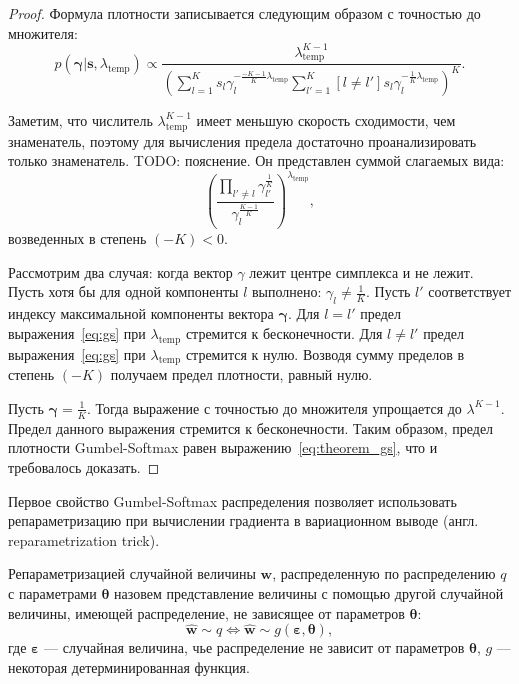 \begin{proof} 
Формула плотности записывается следующим образом с точностью до множителя:
\[
    p(\boldsymbol{\gamma}|\mathbf{s}, {\lambda}_\text{temp}) \propto    \frac{\lambda_{\text{temp}}^{K-1}}{\left(\sum_{l=1}^K s_l\gamma_l^{-\frac{-K-1}{K}\lambda_\text{temp}}\sum_{l'=1}^K [l \neq l']s_l\gamma_l^{-\frac{1}{K}\lambda_\text{temp}}\right)^{K}}.
\]


Заметим, что числитель $\lambda_{\text{temp}}^{K-1}$ имеет меньшую скорость сходимости, чем знаменатель, поэтому для вычисления предела достаточно проанализировать только знаменатель. 
TODO: пояснение. Он представлен суммой слагаемых вида:
\begin{equation}
\label{eq:gs}
    \left(\frac{\prod_{l' \neq l} \gamma_{l'}^{\frac{1}{K}}}{\gamma_l^{\frac{K-1}{K}}}\right)^{\lambda_{\text{temp}}},
\end{equation}
возведенных в степень $(-K)<0.$

Рассмотрим два случая: когда вектор $\gamma$ лежит центре симплекса и не лежит. 
Пусть хотя бы для одной компоненты $l$ выполнено: $\gamma_l \neq \frac{1}{K}$. Пусть $l'$ соответствует индексу максимальной компоненты вектора $\boldsymbol{\gamma}$.
Для $l=l'$ предел выражения~\eqref{eq:gs} при $\lambda_{\text{temp}}$ стремится к бесконечности. Для $l\neq l'$ предел выражения~\eqref{eq:gs} при $\lambda_{\text{temp}}$ стремится к нулю. Возводя сумму пределов в степень $(-K)$ получаем предел плотности, равный нулю.

Пусть $\boldsymbol{\gamma} = \frac{1}{K}$.
Тогда выражение с точностью до множителя упрощается до $\lambda^{K-1}$. Предел данного выражения стремится к бесконечности.
Таким образом, предел плотности Gumbel-Softmax равен выражению~\eqref{eq:theorem_gs}, что и требовалось доказать.

\end{proof}


Первое свойство Gumbel-Softmax распределения позволяет использовать репараметризацию при вычислении градиента в вариационном выводе (англ. reparametrization trick). 
\begin{defin} Репараметризацией случайной величины $\mathbf{w}$, распределенную по распределению $q$ с параметрами $\boldsymbol{\theta}$ назовем представление величины с помощью другой случайной величины, имеющей  распределение, не зависящее от параметров $\boldsymbol{\theta}$:
\[
    \hat{\mathbf{w}} \sim q \iff \hat{\mathbf{w}} \sim g(\boldsymbol{\varepsilon},\boldsymbol{\theta}),
\]
где $\boldsymbol{\varepsilon}$ --- случайная величина, чье распределение не зависит от параметров $\boldsymbol{\theta}$, $g$ --- некоторая детерминированная функция.
\end{defin}

